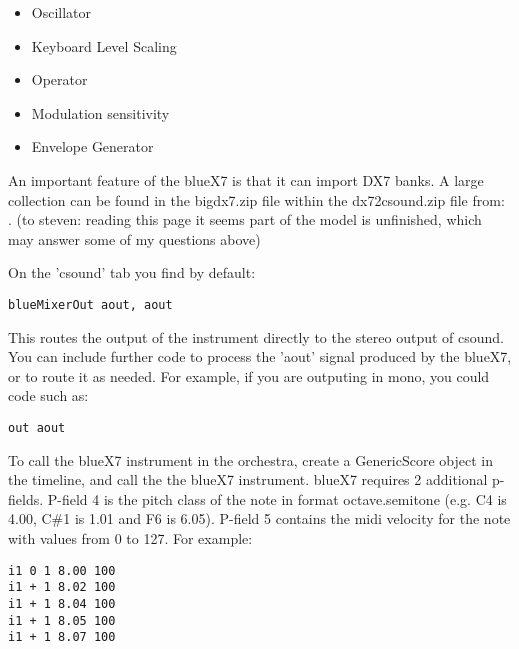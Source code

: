 \begin{itemize}
\item
  Oscillator
\item
  Keyboard Level Scaling
\item
  Operator
\item
  Modulation sensitivity
\item
  Envelope Generator
\end{itemize}

An important feature of the blueX7 is that it can import DX7 banks. A
large collection can be found in the bigdx7.zip file within the
dx72csound.zip file from:
\href{http://www.parnasse.com/dx72csnd.shtml}{}. (to steven: reading
this page it seems part of the model is unfinished, which may answer
some of my questions above)

On the 'csound' tab you find by default:

\begin{verbatim}
blueMixerOut aout, aout
\end{verbatim}

This routes the output of the instrument directly to the stereo output
of csound. You can include further code to process the 'aout' signal
produced by the blueX7, or to route it as needed. For example, if you
are outputing in mono, you could code such as:

\begin{verbatim}
out aout
\end{verbatim}

To call the blueX7 instrument in the orchestra, create a GenericScore
object in the timeline, and call the the blueX7 instrument. blueX7
requires 2 additional p-fields. P-field 4 is the pitch class of the note
in format octave.semitone (e.g. C4 is 4.00, C\#1 is 1.01 and F6 is
6.05). P-field 5 contains the midi velocity for the note with values
from 0 to 127. For example:

\begin{verbatim}
i1 0 1 8.00 100
i1 + 1 8.02 100
i1 + 1 8.04 100
i1 + 1 8.05 100
i1 + 1 8.07 100
\end{verbatim}
